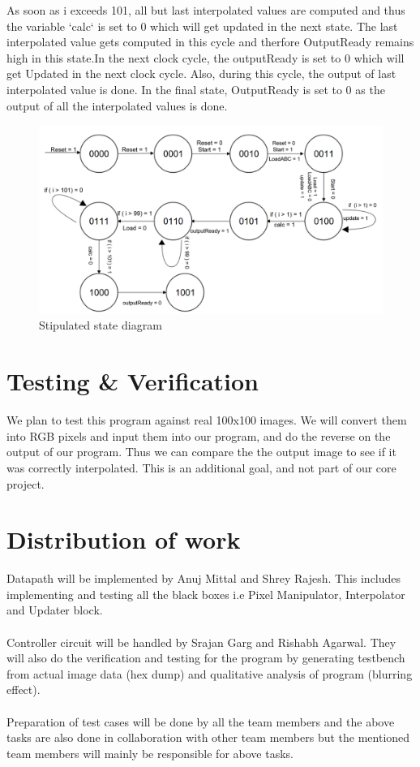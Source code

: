 \documentclass[a4paper,12pt]{article}
\begin{document}
As soon as i exceeds 101, all but last interpolated values are computed and thus the variable `calc` is set to 0 which will get updated in the next state. The last interpolated value gets computed in this cycle and therfore OutputReady remains high in this state.In the next clock cycle, the outputReady is set to 0 which will get Updated in the next clock cycle. Also, during this cycle, the output of last interpolated value is done. In the final state, OutputReady is set to 0 as the output of all the interpolated values is done.

\clearpage

\begin{landscape}
\vspace{5cm}
\begin{figure}
	\includegraphics[scale = 0.43]{state.png}
	\caption{Stipulated state diagram}
\end{figure}
\end{landscape}

\clearpage
\vspace*{-2cm}
\section{Testing \& Verification}
We plan to test this program against real 100x100 images. We will convert them into RGB pixels and input them into our program, and do the reverse on the output of our program. Thus we can compare the the output image to see if it was correctly interpolated. This is an additional goal, and not part of our core project.

\section{Distribution of work}
Datapath will be implemented by Anuj Mittal and Shrey Rajesh. This includes implementing and testing all the black boxes i.e Pixel Manipulator, Interpolator and Updater block.\\\\
Controller circuit will be handled by Srajan Garg and Rishabh Agarwal. They will also do the verification and testing for the program by generating testbench from actual image data (hex dump) and qualitative analysis of program (blurring effect).\\\\
Preparation of test cases will be done by all the team members and the above tasks are also done in collaboration with other team members but the mentioned team members will mainly be responsible for above tasks.
\end{document}
